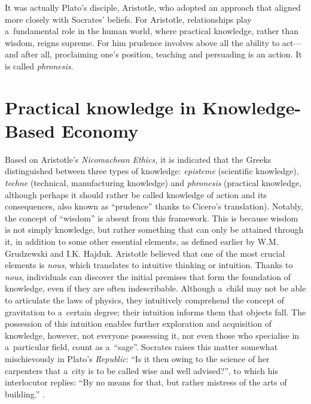 It was actually Plato's disciple, Aristotle, who adopted an approach that aligned more closely with Socrates' beliefs. For Aristotle, relationships play a~fundamental role in the human world, where practical knowledge, rather than wisdom, reigns supreme. For him prudence involves above all the ability to act---and after all, proclaiming one's position, teaching and persuading is an action. It is called \textit{phronesis}.



\section{Practical knowledge in Knowledge-Based Economy}

Based on Aristotle's \textit{Nicomachean Ethics,} it is indicated that the Greeks distinguished between three types of knowledge: \textit{episteme} (scientific knowledge), \textit{techne} (technical, manufacturing knowledge) and \textit{phronesis} (practical knowledge, although perhaps it should rather be called knowledge of action and its consequences, also known as ``prudence'' thanks to Cicero's translation). Notably, the concept of ``wisdom'' is absent from this framework. This is because wisdom is not simply knowledge, but rather something that can only be attained through it, in addition to some other essential elements, as defined earlier by W.M. Grudzewski and I.K. Hajduk. Aristotle believed that one of the most crucial elements is \textit{nous}, which translates to intuitive thinking or intuition. Thanks to \textit{nous}, individuals can discover the initial premises that form the foundation of knowledge, even if they are often indescribable. Although a~child may not be able to articulate the laws of physics, they intuitively comprehend the concept of gravitation to a~certain degree; their intuition informs them that objects fall. The possession of this intuition enables further exploration and acquisition of knowledge, however, not everyone possessing it, nor even those who specialise in a~particular field, count as a~``sage''. Socrates raises this matter somewhat mischievously in Plato's \textit{Republic}: ``Is it then owing to the science of her carpenters that a~city is to be called wise and well advised?'', to which his interlocutor replies: ``By no means for that, but rather mistress of the arts of building.'' 
\parencite[][]{}.%




